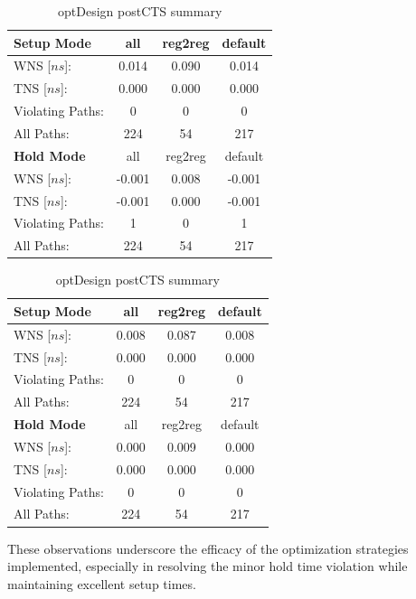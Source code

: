 \begin{table}[!htbp]
    \centering
    \begin{minipage}{0.48\textwidth}
        \centering
        \begin{tabular}{lccc}
            \toprule
            \textbf{Setup Mode} & all & reg2reg & default \\
            \midrule
            WNS [$ns$]: & 0.014 & 0.090 & 0.014 \\
            TNS [$ns$]: & 0.000 & 0.000 & 0.000 \\
            Violating Paths: & 0 & 0 & 0 \\
            All Paths: & 224 & 54 & 217 \\
            \midrule
            \textbf{Hold Mode} & all & reg2reg & default \\
            \midrule
            WNS [$ns$]: & -0.001 & 0.008 & -0.001 \\
            TNS [$ns$]: & -0.001 & 0.000 & -0.001 \\
            Violating Paths: & 1 & 0 & 1 \\
            All Paths: & 224 & 54 & 217 \\
            \bottomrule
        \end{tabular}
        \caption{optDesign postRoute summary}
        \label{tab:optdesign_postroute_summary}
    \end{minipage}
    \hfill
    \begin{minipage}{0.48\textwidth}
        \centering
        \begin{tabular}{lccc}
            \toprule
            \textbf{Setup Mode} & all & reg2reg & default \\
            \midrule
            WNS [$ns$]: & 0.008 & 0.087 & 0.008 \\
            TNS [$ns$]: & 0.000 & 0.000 & 0.000 \\
            Violating Paths: & 0 & 0 & 0 \\
            All Paths: & 224 & 54 & 217 \\
            \midrule
            \textbf{Hold Mode} & all & reg2reg & default \\
            \midrule
            WNS [$ns$]: & 0.000 & 0.009 & 0.000 \\
            TNS [$ns$]: & 0.000 & 0.000 & 0.000 \\
            Violating Paths: & 0 & 0 & 0 \\
            All Paths: & 224 & 54 & 217 \\
            \bottomrule
        \end{tabular}
        \caption{optDesign postCTS summary}
        \label{tab:optdesign_postcts_summary}
    \end{minipage}
\end{table}

These observations underscore the efficacy of the optimization strategies implemented, especially in resolving the minor hold time violation while maintaining excellent setup times.
